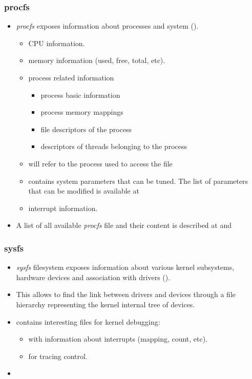 \begin{frame}
  \frametitle{procfs}
  \begin{itemize}
    \item {\em procfs} exposes information about processes and system
          ().
    \begin{itemize}
      \item {} CPU information.
      \item {} memory information (used, free, total, etc).
      \item {} process related information
      \begin{itemize}
        \item{} process basic information
        \item {} process memory mappings
        \item {} file descriptors of the process
        \item {} descriptors of threads belonging
          to the process
      \end{itemize}
      \item {} will refer to the process used to access the file
      \item {} contains system parameters that can be tuned. The
            list of parameters that can be modified is available at
      \item {} interrupt information.
    \end{itemize}
    \item A list of all available {\em procfs} file and their content is
          described at  and 
  \end{itemize}
\end{frame}

\begin{frame}
  \frametitle{sysfs}
  \begin{itemize}
    \item {\em sysfs} filesystem exposes information about various kernel
          subsystems, hardware devices and association with drivers
          ().
    \item This allows to find the link between drivers and devices through a
          file hierarchy representing the kernel internal tree of devices.
    \item {} contains interesting files for kernel debugging:
    \begin{itemize}
      \item {} with information about interrupts (mapping, count, etc).
      \item {} for tracing control.
    \end{itemize}
    \item {}
  \end{itemize}
\end{frame}

